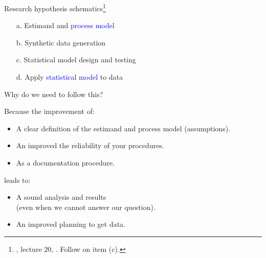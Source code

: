 %
%
\begin{lhframe}[rhgraphic={\texttt{[image: lab\_to\_research.png]}}]
	{Research hypothesis schematics\footnote{\citet{McElreath_2022}, lecture $20$, \citet{Pearl_2019}. Follow \citet{Fogarty_et_al_2022} on item (c).}}
	
	\begin{enumerate}
		\item[a.] Estimand and \textcolor{blue}{process model}
		\item[b.] Synthetic data generation
		\item[c.] Statistical model design and testing
		\item[d.] Apply \textcolor{blue}{statistical model} to data 
	\end{enumerate} 
\end{lhframe}
%
%
\begin{lhframe}[rhgraphic={\texttt{[image: DAG\_to\_research.png]}}]
	{Why do we need to follow this?}
	
	Because the improvement of:
	\begin{itemize}
		\item A clear definition of the estimand and process model (assumptions).
		\item An improved the reliability of your procedures.
		\item As a documentation procedure.
	\end{itemize}
	
	leads to:
	\begin{itemize}
		\item A sound analysis and results \\
		\alert{(even when we cannot answer our question)}.
		\item An improved planning to get data.
	\end{itemize}
\end{lhframe}
%
%